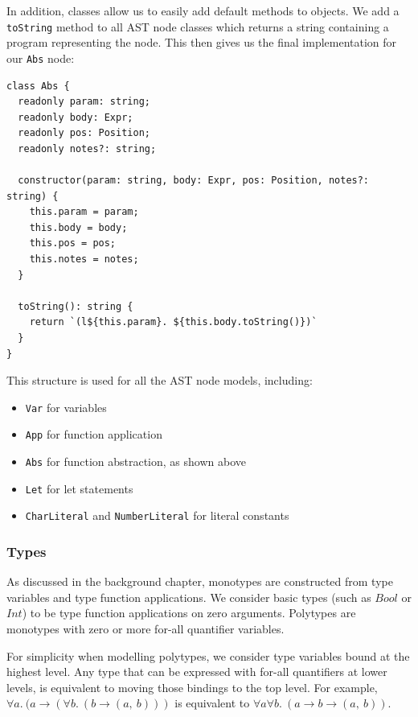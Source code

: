 \documentclass[a4paper,fleqn,oneside,12pt]{report}
\begin{document}
In addition, classes allow us to easily add default methods to objects. We add a \texttt{toString} method to all AST node classes which returns a string containing a program representing the node. This then gives us the final implementation for our \texttt{Abs} node:

\begin{verbatim}
class Abs {
  readonly param: string;
  readonly body: Expr;
  readonly pos: Position;
  readonly notes?: string;

  constructor(param: string, body: Expr, pos: Position, notes?: string) {
    this.param = param;
    this.body = body;
    this.pos = pos;
    this.notes = notes;
  }

  toString(): string {
    return `(l${this.param}. ${this.body.toString()})`
  }
}
\end{verbatim}

This structure is used for all the AST node models, including:
\begin{itemize}
  \item \texttt{Var} for variables
  \item \texttt{App} for function application
  \item \texttt{Abs} for function abstraction, as shown above
  \item \texttt{Let} for let statements
  \item \texttt{CharLiteral} and \texttt{NumberLiteral} for literal constants
\end{itemize}

\subsubsection{Types}\label{id:h.bzdo56ibho4h}

As discussed in the background chapter, monotypes are constructed from type variables and type function applications. We consider basic types (such as $Bool$ or $Int$) to be type function applications on zero arguments. Polytypes are monotypes with zero or more for-all quantifier variables.

For simplicity when modelling polytypes, we consider type variables bound at the highest level. Any type that can be expressed with for-all quantifiers at lower levels, is equivalent to moving those bindings to the top level. For example, $\forall a.\ (a \rightarrow (\forall b.\ (b \rightarrow (a,\ b)))$ is equivalent to $\forall a \forall b.\ (a \rightarrow b \rightarrow (a,\ b))$.
\end{document}
